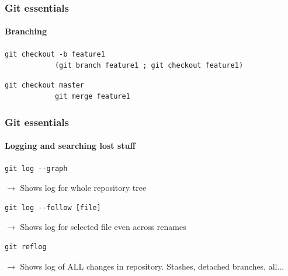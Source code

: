 \documentclass[aspectratio=169]{beamer}
\newcommand{\adjustimg}{%
  \checkoddpage%
  \ifoddpage\hspace*{\dimexpr\evensidemargin-\oddsidemargin}\else\hspace*{-\dimexpr\evensidemargin-\oddsidemargin}\fi%
}
\newcommand{\centerimg}[2][width=\textwidth]{%
  \makebox[\textwidth]{\adjustimg\texttt{[image: \#2]}}%
}
\begin{document}
    \begin{frame}[fragile]
        \frametitle{Git essentials}
        \framesubtitle{Branching}
        \begin{lstlisting}[gobble=12]
            git checkout -b feature1
            (git branch feature1 ; git checkout feature1)
        \end{lstlisting}
        \begin{lstlisting}[gobble=12]
            git checkout master
            git merge feature1
        \end{lstlisting}

    \end{frame}
    \begin{frame}
        \noindent\centerimg[width=1.0\textwidth]{merging-branches-2.png}
    \end{frame}
    \begin{frame}[fragile]
        \frametitle{Git essentials}
        \framesubtitle{Logging and searching lost stuff}
        \begin{lstlisting}[gobble=12]
            git log --graph
        \end{lstlisting}
        $\rightarrow$ Shows log for whole repository tree
        \begin{lstlisting}[gobble=12]
            git log --follow [file]
        \end{lstlisting}
        $\rightarrow$ Shows log for selected file even across renames
        \begin{lstlisting}[gobble=12]
            git reflog
        \end{lstlisting}
        $\rightarrow$ Shows log of ALL changes in repository. Stashes, detached branches, all...
    \end{frame}
\end{document}
